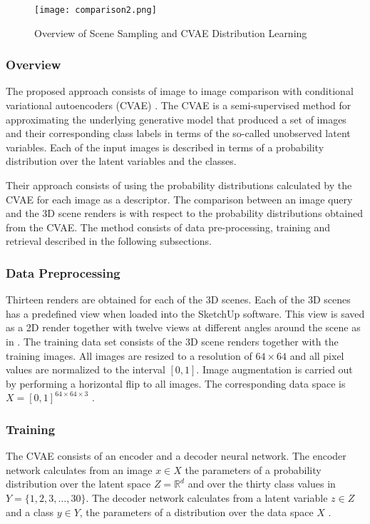 \documentclass[../main.tex]{subfiles}
\begin{document}
\begin{figure}[htb]
	\centering
	\texttt{[image: comparison2.png]}
	\caption{\label{fig:cvae} Overview of Scene Sampling and CVAE Distribution Learning}
\end{figure}

\subsubsection{Overview}
The proposed approach consists of image to image comparison with conditional variational autoencoders (CVAE) \cite{kingma2014semi}. The CVAE is a semi-supervised method for approximating the underlying generative model that produced a set of images and their corresponding class labels in terms of the so-called unobserved latent variables. Each of the input images is described in terms of a probability distribution over the latent variables and the classes. 

Their approach consists of using the probability distributions calculated by the CVAE for each image as a descriptor. The comparison between an image query and the 3D scene renders is with respect to the probability distributions obtained from the CVAE. The method consists of data pre-processing, training and retrieval described in the following subsections.

\subsubsection{Data Preprocessing}
Thirteen renders are obtained for each of the 3D scenes. Each of the 3D scenes has a predefined view when loaded into the SketchUp software. This view is saved as a 2D render together with twelve views at different angles around the scene as in \cite{Su2015}.
The training data set consists of the 3D scene renders together with the training images. All images are resized to a resolution of $64\times64$ and all pixel values are normalized to the interval $[0,1]$. Image augmentation is carried out by performing a horizontal flip to all images. The corresponding data space is $X = [0,1]^{64\times 64 \times 3}$ . 

\subsubsection{Training}
The CVAE consists of an encoder and a decoder neural network. The encoder network calculates from an image $x\in X$ the parameters of a probability distribution over the latent space $Z = \mathbb{R}^d$ and over the thirty class values in $Y = \{1,2,3,\ldots, 30\}$. The decoder network calculates from a latent variable $z\in Z$ and a class $y\in Y$, the parameters of a distribution over the data space $X$ .
\end{document}
